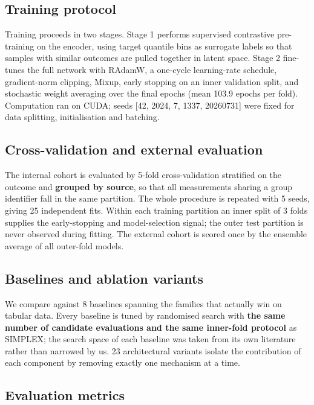\documentclass[utf8]{FrontiersinHarvard}
\begin{document}
\subsection{Training protocol}

Training proceeds in two stages. Stage 1 performs supervised contrastive pre-training on the encoder, using target quantile bins as surrogate labels so that samples with similar outcomes are pulled together in latent space. Stage 2 fine-tunes the full network with RAdamW, a one-cycle learning-rate schedule, gradient-norm clipping, Mixup, early stopping on an inner validation split, and stochastic weight averaging over the final epochs (mean 103.9 epochs per fold). Computation ran on CUDA; seeds [42, 2024, 7, 1337, 20260731] were fixed for data splitting, initialisation and batching.


\subsection{Cross-validation and external evaluation}

The internal cohort is evaluated by 5-fold cross-validation stratified on the outcome and \textbf{grouped by source}, so that all measurements sharing a group identifier fall in the same partition. The whole procedure is repeated with 5 seeds, giving 25 independent fits. Within each training partition an inner split of 3 folds supplies the early-stopping and model-selection signal; the outer test partition is never observed during fitting. The external cohort is scored once by the ensemble average of all outer-fold models.


\subsection{Baselines and ablation variants}

We compare against 8 baselines spanning the families that actually win on tabular data. Every baseline is tuned by randomised search with \textbf{the same number of candidate evaluations and the same inner-fold protocol} as SIMPLEX; the search space of each baseline was taken from its own literature rather than narrowed by us. 23 architectural variants isolate the contribution of each component by removing exactly one mechanism at a time.


\subsection{Evaluation metrics}
\end{document}
